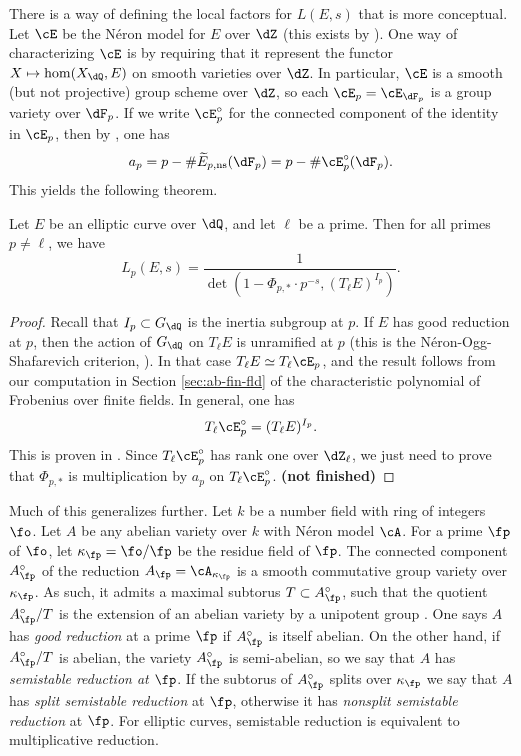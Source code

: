 \documentclass{article}
\begin{document}
There is a way of defining the local factors for $L(E,s)$ that is more 
conceptual. Let $\cE$ be the N\'eron model for $E$ over $\dZ$ (this exists by 
\cite[1.4.3]{blr90}). One way of characterizing $\cE$ is by requiring 
that it represent the functor $X\mapsto \hom(X_\dQ,E)$ on smooth varieties over 
$\dZ$. In particular, $\cE$ is a smooth (but not projective) group scheme over 
$\dZ$, so each $\cE_p=\cE_{\dF_p}$ is a group variety over $\dF_p$. If we write 
$\cE_p^\circ$ for the connected component of the identity in $\cE_p$, then by 
\cite[C.15.1, C.16]{si06}, one has 
\[
  a_p = p - \# \widetilde E_{p,\text{ns}}(\dF_p) = p - \# \cE_p^\circ(\dF_p) \text{.}
\]
This yields the following theorem.

\begin{theorem}
Let $E$ be an elliptic curve over $\dQ$, and let $\ell$ be a prime. Then for all 
primes $p\ne \ell$, we have 
\[
  L_p(E,s) = \frac{1}{\det\left(1-\Phi_{p,\ast}\cdot p^{-s}, (T_\ell E)^{I_p}\right)} \text{.}
\]
\end{theorem}
\begin{proof}
Recall that $I_p\subset G_\dQ$ is the inertia subgroup at $p$. If $E$ has good 
reduction at $p$, then the action of $G_\dQ$ on $T_\ell E$ is unramified at 
$p$ (this is the N\'eron-Ogg-Shafarevich criterion, \cite[thm 1]{st68}). In 
that case $T_\ell E \simeq T_\ell \cE_p$, and the result follows from our 
computation in Section \ref{sec:ab-fin-fld} of the characteristic polynomial 
of Frobenius over finite fields. In general, one has 
\[
  T_\ell\cE_p^\circ = (T_\ell E)^{I_p}\text{.}
\]
This is proven in \cite[IX.2.2]{gr72}. Since $T_\ell \cE_p^\circ$ has rank one 
over $\dZ_\ell$, we just need to prove that $\Phi_{p,\ast}$ is multiplication 
by $a_p$ on $T_\ell \cE_p^\circ$. \textbf{(not finished)}
\end{proof}

Much of this generalizes further. Let $k$ be a number field with ring of 
integers $\fo$. Let $A$ be any abelian variety over $k$ with N\'eron model 
$\cA$. For a prime $\fp$ of $\fo$, let $\kappa_\fp=\fo/\fp$ be the residue 
field of $\fp$. The connected component $A_\fp^\circ$ of the reduction 
$A_\fp = \cA_{\kappa_\fp}$ is a smooth commutative group variety over 
$\kappa_\fp$. As such, it admits a maximal subtorus 
$T\subset A_\fp^\circ$, such that the quotient $A_\fp^\circ/T$ is the extension 
of an abelian variety by a unipotent group \cite[IX.2]{gr72}. One says 
$A$ has \emph{good reduction} at a prime $\fp$ if $A_\fp^\circ$ is itself 
abelian. On the other hand, if $A_\fp^\circ/T$ is abelian, the variety 
$A_\fp^\circ$ is semi-abelian, so we say that $A$ has \emph{semistable 
reduction at $\fp$}. If the subtorus of $A_\fp^\circ$ splits over $\kappa_\fp$ 
we say that $A$ has \emph{split semistable reduction} at $\fp$, otherwise it 
has \emph{nonsplit semistable reduction} at $\fp$. 
For elliptic curves, semistable reduction is equivalent to multiplicative 
reduction. 
\end{document}
